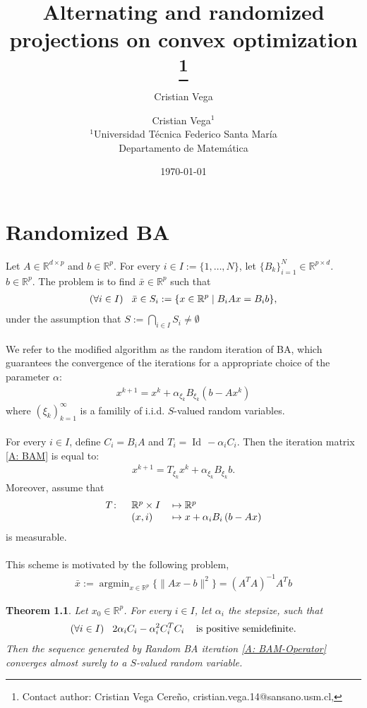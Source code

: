 \documentclass[11pt]{report}
\author{Cristian Vega}
\title{\sffamily Alternating and randomized projections on convex optimization
\footnote{Contact author: 
Cristian Vega Cere\~no, {\ttfamily cristian.vega.14@sansano.usm.cl},
}}
\author{Cristian Vega$^1$ 
\\[5mm]
\small $\!^1$Universidad T\'ecnica Federico Santa Mar\'ia\\
\small Departamento de Matem\'atica\\
}
\date{\ttfamily \today}
\newcommand{\Id}{\ensuremath{\operatorname{Id}}\,}
\newcommand{\RR}{\ensuremath{\mathbb{R}}}
\newcommand{\argmin}{\ensuremath{\operatorname{argmin}}}
\newtheorem{theorem}{Theorem}[chapter]
\theoremstyle{plain}{\theorembodyfont{\rmfamily}%
\newtheorem{assumption}[theorem]{Assumption}}
\theoremstyle{plain}{\theorembodyfont{\rmfamily}%
\newtheorem{algorithm}[theorem]{Algorithm}}
\theoremstyle{plain}{\theorembodyfont{\rmfamily}%
\newtheorem{example}[theorem]{Example}}
\theoremstyle{plain}{\theorembodyfont{\rmfamily}%
\newtheorem{remark}[theorem]{Remark}}
\theoremstyle{plain}{\theorembodyfont{\rmfamily}%
\newtheorem{definition}[theorem]{Definition}}
\theoremstyle{plain}{\theorembodyfont{\rmfamily}%
\newtheorem{problem}[theorem]{Problem}}
\numberwithin{equation}{chapter}
\begin{document}
\chapter{Randomized BA} 
 \begin{problem}
\label{problema 1}
Let $A\in\RR^{d\times p}$ and $b\in\RR^p$. For every $i\in I:=\{1,\dots,N\}$, let  $\{B_{k}\}_{i=1}^{N}\in\RR^{p\times d}$. $b\in\RR^p$. The problem is to find $\bar{x}\in \RR^{p}$ such that
\begin{align}
    (\forall i\in I)\hspace{3mm} \bar{x}\in S_i:=\{x\in \RR^{p}\mid B_i Ax=B_i b\},
\end{align}
under the assumption that $S:=\bigcap_{i\in I}S_{i}\neq\emptyset$\\ \\
We refer to the modified algorithm as the random iteration of BA, which guarantees the convergence of the iterations for a appropriate choice of the parameter $\alpha$:
 \begin{align}
    x^{k+1}=x^{k}+\alpha_{\xi_{k}}B_{\xi_{k}}\left(b-Ax^k\right)
    \label{A: BAM}
\end{align}
where $\left(\xi_{k}\right)_{k=1}^{\infty}$ is a familily of i.i.d.  $S$-valued random variables.\\ \\For every $i\in I$, define $C_{i}=B_{i}A$ and $T_{i}=\Id-\alpha_{i}C_{i}$. Then the iteration matrix  \eqref{A: BAM} is equal to:
\begin{align}
    x^{k+1}=T_{\xi_{k}}x^{k}+\alpha_{\xi_{k}} B_{\xi_{k}}b.
    \label{A: BAM-Operator}
\end{align}
Moreover, assume that 
\begin{align}\begin{tabular}{lll}
    $T\colon$ &$\RR^{p}\times I$&$\mapsto \RR^{p}$\nonumber\\
    & $(x,i)$&$\mapsto x+\alpha_{i}B_{i}\left(b-Ax\right)$
\end{tabular}
\end{align}
is measurable.
\\ \\ This scheme is motivated by the following problem,
\begin{align}
    \bar{x}:=\argmin_{x\in\RR^{p}}\{\|Ax-b\|^2\}=(A^{T}A)^{-1}A^{T}b
\end{align}
\end{problem}
\begin{theorem}\label{T:Convergence} Let $x_0\in\RR^{p}$. For every $i\in I$, let $\alpha_i$ the stepsize, such that 
    \begin{align}
        (\forall i\in I)\hspace{3mm} 2\alpha_{i}C_i-\alpha^{2}_{i}C^{T}_{i}C_{i}\hspace{3mm}\text{ is positive semidefinite.}
        \label{c: conditionlambda}
    \end{align}
    Then the sequence generated by Random BA iteration \eqref{A: BAM-Operator}  converges almost surely to a $S$-valued random variable.
\end{theorem} 
\end{document}
